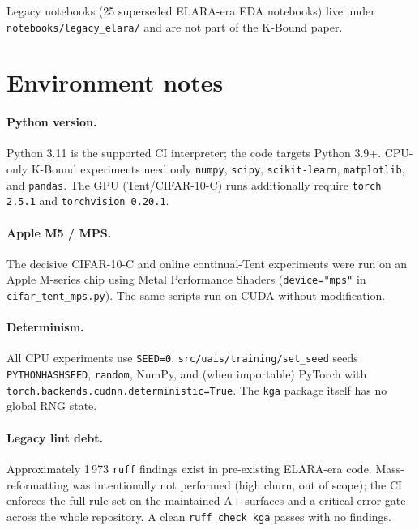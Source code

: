 Legacy notebooks (25 superseded ELARA-era EDA notebooks) live under
\texttt{notebooks/legacy\_elara/} and are not part of the K-Bound paper.

\section{Environment notes}
\label{sec:app-repro-env}

\paragraph{Python version.}
Python 3.11 is the supported CI interpreter; the code targets Python 3.9+.
CPU-only K-Bound experiments need only \texttt{numpy}, \texttt{scipy},
\texttt{scikit-learn}, \texttt{matplotlib}, and \texttt{pandas}.  The GPU
(Tent/CIFAR-10-C) runs additionally require \texttt{torch 2.5.1} and
\texttt{torchvision 0.20.1}.

\paragraph{Apple M5 / MPS.}
The decisive CIFAR-10-C and online continual-Tent experiments were run on an
Apple M-series chip using Metal Performance Shaders (\texttt{device="mps"}
in \texttt{cifar\_tent\_mps.py}).  The same scripts run on CUDA without
modification.

\paragraph{Determinism.}
All CPU experiments use \texttt{SEED=0}.  \texttt{src/uais/training/set\_seed}
seeds \texttt{PYTHONHASHSEED}, \texttt{random}, NumPy, and (when importable)
PyTorch with \texttt{torch.backends.cudnn.deterministic=True}.  The \texttt{kga}
package itself has no global RNG state.

\paragraph{Legacy lint debt.}
Approximately 1\,973 \texttt{ruff} findings exist in pre-existing ELARA-era
code.  Mass-reformatting was intentionally not performed (high churn, out of
scope); the CI enforces the full rule set on the maintained A$+$ surfaces and a
critical-error gate across the whole repository.  A clean \texttt{ruff check kga}
passes with no findings.


